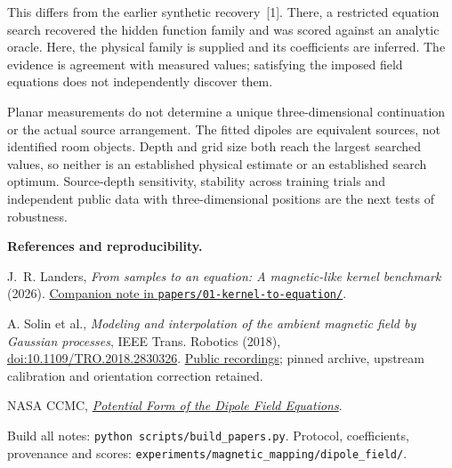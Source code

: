 \documentclass[11pt,letterpaper]{article}
\begin{document}
This differs from the earlier synthetic recovery~[1]. There, a restricted
equation search recovered the hidden function family and was scored against an
analytic oracle. Here, the physical family is supplied and its coefficients are
inferred. The evidence is agreement with measured values; satisfying the imposed
field equations does not independently discover them.

Planar measurements do not determine a unique three-dimensional continuation or
the actual source arrangement. The fitted dipoles are equivalent sources, not
identified room objects. Depth and grid size both reach the largest searched values,
so neither is an established physical estimate or an established search optimum.
Source-depth sensitivity, stability across training trials and independent public
data with three-dimensional positions are the next tests of robustness.

\vfill
{\footnotesize\raggedright
\textbf{References and reproducibility.}\par
[1] J.~R. Landers, \emph{From samples to an equation: A magnetic-like kernel benchmark}
(2026). \href{../01-kernel-to-equation/kernel_to_equation.pdf}{Companion note in \texttt{papers/01-kernel-to-equation/}}.\par
[2] A. Solin et al., \emph{Modeling and interpolation of the ambient magnetic field
by Gaussian processes}, IEEE Trans. Robotics (2018),
\href{https://doi.org/10.1109/TRO.2018.2830326}{doi:10.1109/TRO.2018.2830326}.
\href{https://github.com/AaltoML/magnetic-data}{Public recordings}; pinned archive,
upstream calibration and orientation correction retained.\par
[3] NASA CCMC, \href{https://ccmc.gsfc.nasa.gov/static/files/Dipole.pdf}{\emph{Potential Form of the Dipole Field Equations}}.\par
Build all notes: \texttt{python scripts/build\_papers.py}.
Protocol, coefficients, provenance and scores:
\texttt{experiments/magnetic\_mapping/dipole\_field/}.\par}
\end{document}
